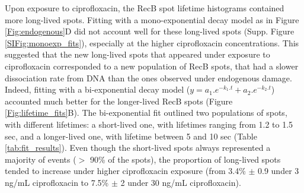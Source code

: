 Upon exposure to ciprofloxacin, the RecB spot lifetime histograms contained more long-lived spots. Fitting with a mono-exponential decay model as in Figure \ref{Fig:endogenous}D did not account well for these long-lived spots (Supp. Figure \ref{SIFig:monoexp_fits}), especially at the higher ciprofloxacin concentrations. This suggested that the new long-lived spots that appeared under exposure to ciprofloxacin corresponded to a new population of RecB spots, that had a slower dissociation rate from DNA than the ones observed under endogenous damage. Indeed, fitting with a bi-exponential decay model ($y = a_1.e^{-k_1.t} + a_2.e^{-k_2.t}$) accounted much better for the longer-lived RecB spots (Figure \ref{Fig:lifetime_fits}B). The bi-exponential fit outlined two populations of spots, with different lifetimes: a short-lived one, with lifetimes ranging from 1.2 to 1.5 sec, and a longer-lived one, with lifetime between 5 and 10 sec (Table \ref{tab:fit_results}). Even though the short-lived spots always represented a majority of events ($>$ 90\% of the spots), the proportion of long-lived spots tended to increase under higher ciprofloxacin exposure (from 3.4\% $\pm$ 0.9 under 3 ng/mL ciprofloxacin to 7.5\% $\pm$ 2 under 30 ng/mL ciprofloxacin).

